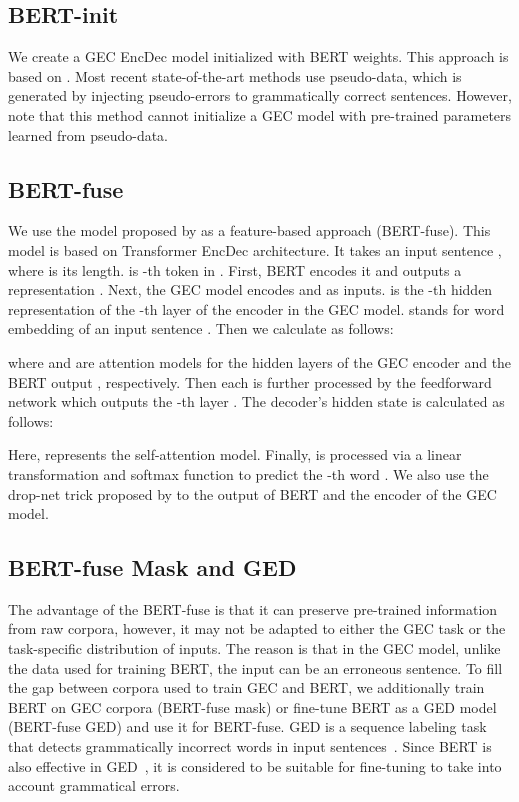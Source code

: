 \documentclass[11pt,a4paper]{article}
\begin{document}
\noindent
\subsection{BERT-init}
We create a GEC EncDec model initialized with BERT weights.
This approach is based on \citet{lample2019cross}.
Most recent state-of-the-art methods use pseudo-data, which is generated by injecting pseudo-errors to grammatically correct sentences.
However, note that this method cannot initialize a GEC model with pre-trained parameters learned from pseudo-data.


\noindent
\subsection{BERT-fuse}
We use the model proposed by \citet{Zhu2020IncorporatingBI} as a feature-based approach (BERT-fuse).
This model is based on Transformer EncDec architecture.
It takes an input sentence , where  is its length.
 is -th token in .
First, BERT encodes it and outputs a representation .
Next, the GEC model encodes  and  as inputs.
 is the -th hidden representation of the -th layer of the encoder in the GEC model.
 stands for word embedding of an input sentence .
Then we calculate  as follows:

where  and  are attention models for the hidden layers of the GEC encoder  and the BERT output , respectively.
Then each  is further processed by the feedforward network  which outputs the -th layer .
The decoder's hidden state  is calculated as follows:

Here,  represents the self-attention model.
Finally,  is processed via a linear transformation and softmax function to predict the -th word .
We also use the drop-net trick proposed by \citet{Zhu2020IncorporatingBI} to the output of BERT and the encoder of the GEC model.



\noindent
\subsection{BERT-fuse Mask and GED}
The advantage of the BERT-fuse is that it can preserve pre-trained information from raw corpora, however, it may not be adapted to either the GEC task or the task-specific distribution of inputs.
The reason is that in the GEC model, unlike the data used for training BERT, the input can be an erroneous sentence.
To fill the gap between corpora used to train GEC and BERT, we additionally train BERT on GEC corpora (BERT-fuse mask) or fine-tune BERT as a GED model (BERT-fuse GED) and use it for BERT-fuse.
GED is a sequence labeling task that detects grammatically incorrect words in input sentences~\cite{rei-yannakoudakis-2016-compositional,kaneko-etal-2017-grammatical}.
Since BERT is also effective in GED~\cite{bell-etal-2019-context,Kaneko2019MultiHeadMA}, it is considered to be suitable for fine-tuning to take into account grammatical errors.
\end{document}
